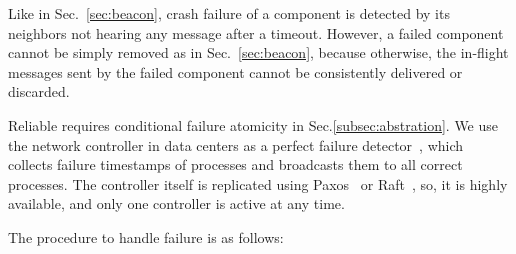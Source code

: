 Like in Sec.~\ref{sec:beacon}, crash failure of a component is detected by its neighbors not hearing any message after a timeout.
However, a failed component cannot be simply removed as in Sec.~\ref{sec:beacon}, because otherwise, the in-flight messages sent by the failed component cannot be consistently delivered or discarded.

Reliable \sys{} requires conditional failure atomicity in Sec.\ref{subsec:abstration}.
We use the network controller in data centers as a perfect failure detector~\cite{chandra1996unreliable}, which collects failure timestamps of processes and broadcasts them to all correct processes.
The controller itself is replicated using Paxos~\cite{lamport1998part} or Raft~\cite{raft}, so, it is highly available, and only one controller is active at any time.

The procedure to handle failure is as follows:

